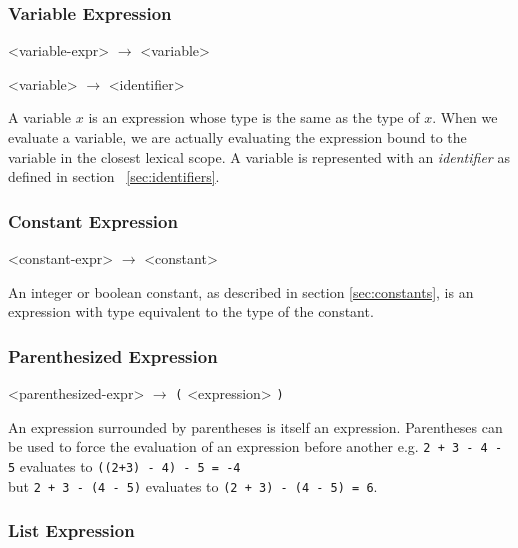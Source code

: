 %
%
%



\subsubsection{Variable Expression}

\begin{grammar}
<variable-expr> $\rightarrow$ <variable> 

<variable> $\rightarrow$ <identifier> 
\end{grammar}
A variable $x$ is an expression whose type is the same as the type of $x$.
When we evaluate a variable, we are actually evaluating
the expression bound to the variable in the closest lexical scope. A variable is represented with
an \emph{identifier} as defined in section ~\ref{sec:identifiers}.

\subsubsection{Constant Expression}
\begin{grammar}
<constant-expr> $\rightarrow$ <constant> 
\end{grammar}
An integer or boolean constant, as described in section \ref{sec:constants}, is an expression
with type equivalent to the type of the constant.

\subsubsection{Parenthesized Expression}
\begin{grammar}
<parenthesized-expr> $\rightarrow$ \texttt{(} <expression> \texttt{)}
\end{grammar}
An expression surrounded by parentheses is itself an expression. Parentheses can be used to force the evaluation
of an expression before another e.g. \texttt{2 + 3 - 4 - 5} evaluates to \texttt{((2+3) - 4) - 5 = -4}\\ but
\texttt{2 + 3 - (4 - 5)} evaluates to \texttt{(2 + 3) - (4 - 5) = 6}.

\subsubsection{List Expression}

